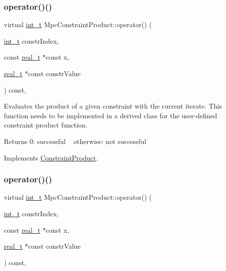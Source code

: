 \subsubsection{\texorpdfstring{operator()()}{operator()()}\hspace{0.1cm}{\footnotesize\ttfamily [1/2]}}
{\footnotesize\ttfamily virtual \hyperlink{_types_8hpp_ab6fd6105e64ed14a0c9281326f05e623}{int\+\_\+t} Mpc\+Constraint\+Product\+::operator() (\begin{DoxyParamCaption}\item[{\hyperlink{_types_8hpp_ab6fd6105e64ed14a0c9281326f05e623}{int\+\_\+t}}]{constr\+Index,  }\item[{const \hyperlink{qp_o_a_s_e_s__wrapper_8h_a0d00e2b3dfadee81331bbb39068570c4}{real\+\_\+t} $\ast$const}]{x,  }\item[{\hyperlink{qp_o_a_s_e_s__wrapper_8h_a0d00e2b3dfadee81331bbb39068570c4}{real\+\_\+t} $\ast$const}]{constr\+Value }\end{DoxyParamCaption}) const\hspace{0.3cm}{\ttfamily [inline]}, {\ttfamily [virtual]}}

Evaluates the product of a given constraint with the current iterate. This function needs to be implemented in a derived class for the user-\/defined constraint product function. \begin{DoxyReturn}{Returns}
0\+: successful ~\newline
 otherwise\+: not successful 
\end{DoxyReturn}


Implements \hyperlink{class_constraint_product_a597e1001d283a43844b4bb8d45d6b9bd}{Constraint\+Product}.

\mbox{\label{class_mpc_constraint_product_af18c36ba5b5cf6c1c33b03d4bf37f8dc}} 
\subsubsection{\texorpdfstring{operator()()}{operator()()}\hspace{0.1cm}{\footnotesize\ttfamily [2/2]}}
{\footnotesize\ttfamily virtual \hyperlink{_types_8hpp_ab6fd6105e64ed14a0c9281326f05e623}{int\+\_\+t} Mpc\+Constraint\+Product\+::operator() (\begin{DoxyParamCaption}\item[{\hyperlink{_types_8hpp_ab6fd6105e64ed14a0c9281326f05e623}{int\+\_\+t}}]{constr\+Index,  }\item[{const \hyperlink{qp_o_a_s_e_s__wrapper_8h_a0d00e2b3dfadee81331bbb39068570c4}{real\+\_\+t} $\ast$const}]{x,  }\item[{\hyperlink{qp_o_a_s_e_s__wrapper_8h_a0d00e2b3dfadee81331bbb39068570c4}{real\+\_\+t} $\ast$const}]{constr\+Value }\end{DoxyParamCaption}) const\hspace{0.3cm}{\ttfamily [inline]}, {\ttfamily [virtual]}}

